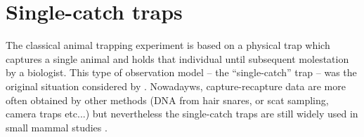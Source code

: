 \section{Single-catch traps}
\label{poisson-mn.sec.singlecatch}

The classical animal trapping experiment is based on a physical trap
which captures a single animal and holds that individual until
subsequent molestation by a biologist.
This type of observation model -- the ``single-catch'' trap --
was the original situation considered by
\citet{efford:2004}. Nowadayws, capture-recapture data are more often
obtained by other methods (DNA from hair snares, or scat sampling,
camera traps etc...) but nevertheless the single-catch traps are still
widely used in small mammal studies \citep{converse_1996, converse_royle:2012, converse_royle:2013}.

